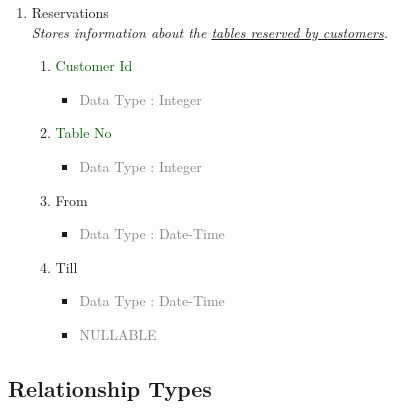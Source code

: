 \begin{enumerate}
        \item Reservations \\
        \textit{Stores information about the \underline{tables reserved by customers}.}
            \begin{enumerate}[label=\alph*.]
                \item \textcolor{darkgreen}{Customer Id}
                    \begin{itemize}[label=-]
                        \item \textcolor{gray}{Data Type : Integer}
                    \end{itemize}
                \item \textcolor{darkgreen}{Table No}
                    \begin{itemize}[label=-]
                        \item \textcolor{gray}{Data Type : Integer}
                    \end{itemize}
                \item From
                    \begin{itemize}[label=-]
                        \item \textcolor{gray}{Data Type : Date-Time}
                    \end{itemize}
                \item Till
                    \begin{itemize}[label=-]
                        \item \textcolor{gray}{Data Type : Date-Time}
                        \item \textcolor{gray}{NULLABLE}
                    \end{itemize}
            \end{enumerate}
    \end{enumerate}

\subsection{Relationship Types}
